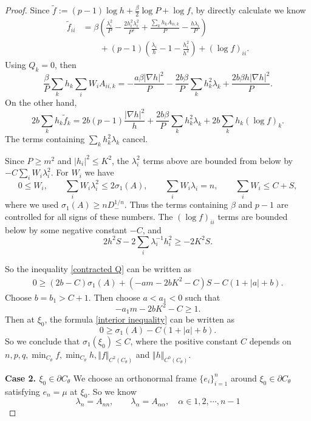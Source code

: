 \documentclass[10pt,a4paper]{amsart}
\begin{document}
\begin{proof}
Since $\tilde f:=(p-1)\log h+\frac{\beta}{2}\log P+\log f$, by directly calculate we know
\begin{equation}\label{f second derivatives}
\begin{split}
        \tilde f_{ii}
        &=\beta\left(
        \frac{\lambda_i^2}{P}
        -\frac{2h_i^2\lambda_i^2}{P^2}
        +\frac{\sum_k h_kA_{ii,k}}{P}
        -\frac{h\lambda_i}{P}\right)\\
        &\qquad
        +(p-1)\left(\frac{\lambda_i}{h}-1-\frac{h_i^2}{h^2}\right)
        +(\log f)_{ii}.
\end{split}
\end{equation}
Using $Q_k=0$, then
\[
      \frac{\beta}{P}
        \sum_kh_k\sum_iW_iA_{ii,k}=  -\frac{a\beta|\nabla h|^2}{P}
        -\frac{2b\beta}{P}\sum_kh_k^2\lambda_k
        +\frac{2b\beta h|\nabla h|^2}{P}.
\]
On the other hand,
\[
        2b\sum_kh_k\tilde f_k
        =2b(p-1)\frac{|\nabla h|^2}{h}
        +\frac{2b\beta}{P}\sum_kh_k^2\lambda_k
        +2b\sum_kh_k(\log f)_k.
\]
The terms containing $\sum_kh_k^2\lambda_k$ cancel.

Since
$P\geq m^2$ and $|h_i|^2\leq K^2$, the $\lambda_i^2$ terms above
are bounded from below by $-C\sum_iW_i\lambda_i^2$. For $W_i$ we have
\[
        0\leq W_i,\qquad
        \sum_iW_i\lambda_i^2\leq 2\sigma_1(A),\qquad
        \sum_iW_i\lambda_i= n,\qquad
        \sum_iW_i\leq C+S,
\]
where we used $\sigma_1(A)\geq nD_-^{1/n}$. Thus the terms containing
$\beta$ and $p-1$ are controlled for all signs of these numbers. The
$(\log f)_{ii}$ terms are bounded below by some negative constant $-C$, and
\[
        2h^2S-2\sum_i\lambda_i^{-1}h_i^2\geq -2K^2S.
\]

So the inequality \eqref{contracted Q} can be written as
\begin{equation}\label{interior inequality}
\begin{split}
        0\geq
        (2b-C)\sigma_1(A)+(-am-2bK^2-C)S
        -C(1+|a|+b).
\end{split}
\end{equation}
Choose $b=b_1>C+1$. Then choose $a<a_1<0$ such that
\[
        -a_1m-2bK^2-C\geq 1.
\]
Then at $\xi_0$, the formula \eqref{interior inequality} can be written as 
\[
        0\geq \sigma_1(A) - C(1+|a|+b).
\]
So we conclude that $\sigma_1(\xi_0)\leq C$, where the positive constant $C$ depends on $n, p, q, \min_{C_{\theta}}f, \min_{C_{\theta}}h, \Vert f\Vert_{C^2 (C_{\theta})}$ and $\Vert h\Vert _{C^0 (C_{\theta})}$.

\noindent\textbf{Case 2. $\xi_0\in \partial C_{\theta}$}
We choose an orthonormal frame $\{e_i\}_{i=1}^n$ around $\xi_0\in\partial C_{\theta}$ satisfying $e_n=\mu$ at $\xi_0$. So we know 
\[
        \lambda_n=A_{nn},\qquad
        \lambda_{\alpha}=A_{\alpha\alpha}, \quad \alpha\in 1,2,\cdots, n-1
\]


\end{proof}
\end{document}
